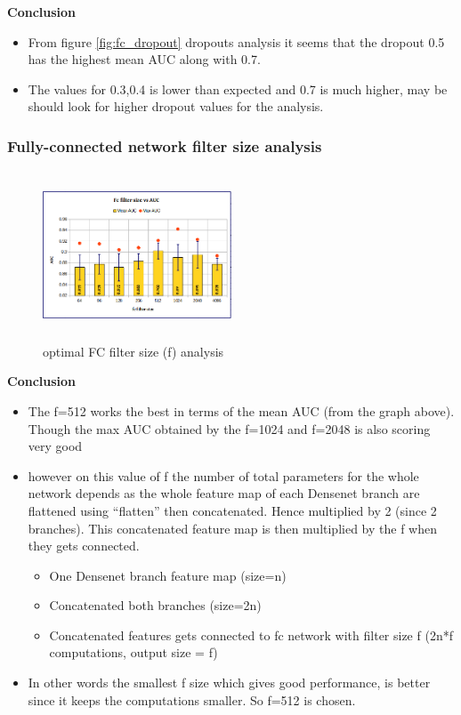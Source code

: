 \textbf{Conclusion} 
\begin{itemize}
 \item From figure \ref{fig:fc_dropout} dropouts analysis it seems that the dropout 0.5 has the highest mean AUC along with 0.7. 
 \item The values for 0.3,0.4 is lower than expected and 0.7 is much higher, may be should look for higher dropout values for the analysis.
\end{itemize}


\subsubsection{Fully-connected network filter size analysis}

\begin{figure}[ht]
\centering
\includegraphics[height=5cm,width=0.5\textwidth]{images/densenet/fc_filter_size}
\caption{optimal FC filter size (f) analysis}
\label{fig:fc_filter_size}
\end{figure}

\textbf{Conclusion} 
\begin{itemize}
 \item The f=512 works the best in terms of the mean AUC (from the graph above). Though the max AUC obtained by the f=1024 and f=2048 is also scoring very good
 \item however on this value of f the number of total parameters for the whole network depends as the whole feature map of each Densenet branch are flattened using “flatten” then concatenated.
 Hence multiplied by 2 (since 2 branches). This concatenated feature map is then multiplied by the f when they gets connected.
  \begin{itemize}
    \item One Densenet branch feature map (size=n) 
    \item Concatenated both branches (size=2n) 
    \item Concatenated features gets connected to fc network with filter size f (2n*f computations, output size = f)
  \end{itemize} 
 \item In other words the smallest f size which gives good performance, is better since it keeps the computations smaller. So f=512 is chosen.
\end{itemize}

